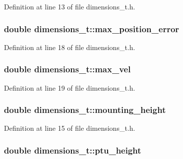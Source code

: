 \-Definition at line 13 of file dimensions\-\_\-t.\-h.

\subsubsection[{max\-\_\-position\-\_\-error}]{\setlength{\rightskip}{0pt plus 5cm}double {\bf dimensions\-\_\-t\-::max\-\_\-position\-\_\-error}}\label{classdimensions__t_a14a9baad07068a5233006f92e989a42b}


\-Definition at line 18 of file dimensions\-\_\-t.\-h.

\subsubsection[{max\-\_\-vel}]{\setlength{\rightskip}{0pt plus 5cm}double {\bf dimensions\-\_\-t\-::max\-\_\-vel}}\label{classdimensions__t_aa7e4b8757b6355ae3a4cbe513b04f693}


\-Definition at line 19 of file dimensions\-\_\-t.\-h.

\subsubsection[{mounting\-\_\-height}]{\setlength{\rightskip}{0pt plus 5cm}double {\bf dimensions\-\_\-t\-::mounting\-\_\-height}}\label{classdimensions__t_a7a12a3b4d47eba4bf2f7508f6977e9e5}


\-Definition at line 15 of file dimensions\-\_\-t.\-h.

\subsubsection[{ptu\-\_\-height}]{\setlength{\rightskip}{0pt plus 5cm}double {\bf dimensions\-\_\-t\-::ptu\-\_\-height}}\label{classdimensions__t_a49beb46e33c8605fa53e436af59a2146}


